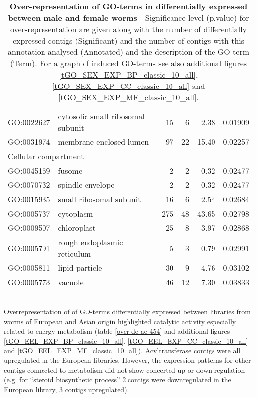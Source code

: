 \begin{longtable}{lp{4.5cm}rrrl}
  GO:0022627 & cytosolic small ribosomal subunit &  15 &   6 & 2.38 & 0.01909 \\ 
  GO:0031974 & membrane-enclosed lumen &  97 &  22 & 15.40 & 0.02257 \\ 
   \hline
   \multicolumn{6}{l}{Cellular compartment}  \\ 
GO:0045169 & fusome &   2 &   2 & 0.32 & 0.02477 \\ 
  GO:0070732 & spindle envelope &   2 &   2 & 0.32 & 0.02477 \\ 
  GO:0015935 & small ribosomal subunit &  16 &   6 & 2.54 & 0.02684 \\ 
  GO:0005737 & cytoplasm & 275 &  48 & 43.65 & 0.02798 \\ 
  GO:0009507 & chloroplast &  25 &   8 & 3.97 & 0.02868 \\ 
  GO:0005791 & rough endoplasmic reticulum &   5 &   3 & 0.79 & 0.02991 \\ 
  GO:0005811 & lipid particle &  30 &   9 & 4.76 & 0.03102 \\ 
  GO:0005773 & vacuole &  46 &  12 & 7.30 & 0.03833 \\ 
\hline\\
\caption[Over-representation of GO-terms in positively
selected]{\textbf{Over-representation of GO-terms in differentially
    expressed between male and female worms} - Significance level
  (p.value) for over-representation are given along with the number of
  differentially expressed contigs (Significant) and the number of
  contigs with this annotation analysed (Annotated) and the
  description of the GO-term (Term). For a graph of induced GO-terms
  see also additional figures \ref{tGO_SEX_EXP_BP_classic_10_all},
  \ref{tGO_SEX_EXP_CC_classic_10_all} and
  \ref{tGO_SEX_EXP_MF_classic_10_all}.}\\
\label{over-de-mf-454}
\end{longtable}


Overrepresentation of of GO-terms differentially expressed between
libraries from worms of European and Asian origin highlighted catalytic
activity especially related to energy metabolism
(table \ref{over-de-ae-454} and additional figures
\ref{tGO_EEL_EXP_BP_classic_10_all},
\ref{tGO_EEL_EXP_CC_classic_10_all} and
\ref{tGO_EEL_EXP_MF_classic_10_all}).  Acyltransferase contigs were
all upregulated in the European libraries. However, the expression
patterns for other contigs connected to metabolism did not show
concerted up or down-regulation (e.g. for ``steroid biosynthetic
process'' 2 contigs were downregulated in the European library, 3
contigs upregulated).


